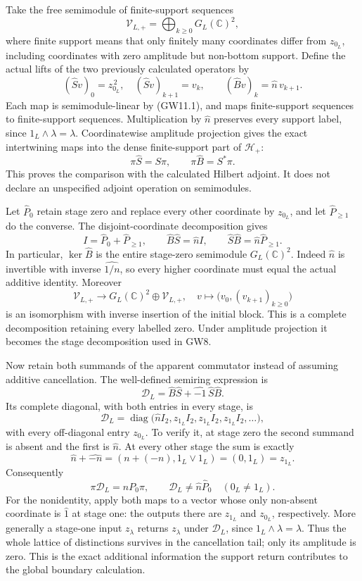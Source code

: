 Take the free semimodule of finite-support sequences \[
\mathscr V_{L,+}=\bigoplus_{k\ge0}G_L(\mathbb C)^2,
\] where finite support means that only finitely many coordinates differ
from \(z_{0_L}\), including coordinates with zero amplitude but
non-bottom support. Define the actual lifts of the two previously
calculated operators by \[
(\widehat Sv)_0=z_{0_L}^{\,2},\quad
(\widehat Sv)_{k+1}=v_k,\qquad
(\widehat Bv)_k=\widehat n\,v_{k+1}.
\tag{GW11.3}
\] Each map is semimodule-linear by (GW11.1), and maps finite-support
sequences to finite-support sequences. Multiplication by \(\widehat n\)
preserves every support label, since \(1_L\wedge\lambda=\lambda\).
Coordinatewise amplitude projection gives the exact intertwining maps
into the dense finite-support part of \(\mathcal H_+\): \[
\pi\widehat S=S\pi,\qquad \pi\widehat B=S^*\pi.
\tag{GW11.4}
\] This proves the comparison with the calculated Hilbert adjoint. It
does not declare an unspecified adjoint operation on semimodules.

Let \(\widehat P_0\) retain stage zero and replace every other
coordinate by \(z_{0_L}\), and let \(\widehat P_{\ge1}\) do the
converse. The disjoint-coordinate decomposition gives \[
I=\widehat P_0+\widehat P_{\ge1},\qquad
\widehat B\widehat S=\widehat n I,\qquad
\widehat S\widehat B=\widehat n\widehat P_{\ge1}.
\tag{GW11.5}
\] In particular, \(\ker\widehat B\) is the entire stage-zero semimodule
\(G_L(\mathbb C)^2\). Indeed \(\widehat n\) is invertible with inverse
\(\widehat{1/n}\), so every higher coordinate must equal the actual
additive identity. Moreover \[
\mathscr V_{L,+}\longrightarrow G_L(\mathbb C)^2\oplus\mathscr V_{L,+},
\quad v\longmapsto\bigl(v_0,(v_{k+1})_{k\ge0}\bigr)
\] is an isomorphism with inverse insertion of the initial block. This
is a complete decomposition retaining every labelled zero. Under
amplitude projection it becomes the stage decomposition used in GW8.

Now retain both summands of the apparent commutator instead of assuming
additive cancellation. The well-defined semiring expression is \[
\mathscr D_L=\widehat B\widehat S+
\widehat{-1}\,\widehat S\widehat B.
\tag{GW11.6}
\] Its complete diagonal, with both entries in every stage, is \[
\mathscr D_L=
\operatorname{diag}\bigl(\widehat n I_2,
z_{1_L}I_2,z_{1_L}I_2,z_{1_L}I_2,\ldots\bigr),
\tag{GW11.7}
\] with every off-diagonal entry \(z_{0_L}\). To verify it, at stage
zero the second summand is absent and the first is \(\widehat n\). At
every other stage the sum is exactly \[
\widehat n+\widehat{-n}=(n+(-n),1_L\vee1_L)=(0,1_L)=z_{1_L}.
\] Consequently \[
\pi\mathscr D_L=nP_0\pi,
\qquad
\mathscr D_L\ne\widehat n\widehat P_0\quad(0_L\ne1_L).
\tag{GW11.8}
\] For the nonidentity, apply both maps to a vector whose only
non-absent coordinate is \(\widehat1\) at stage one: the outputs there
are \(z_{1_L}\) and \(z_{0_L}\), respectively. More generally a
stage-one input \(z_\lambda\) returns \(z_\lambda\) under
\(\mathscr D_L\), since \(1_L\wedge\lambda=\lambda\). Thus the whole
lattice of distinctions survives in the cancellation tail; only its
amplitude is zero. This is the exact additional information the support
return contributes to the global boundary calculation.


